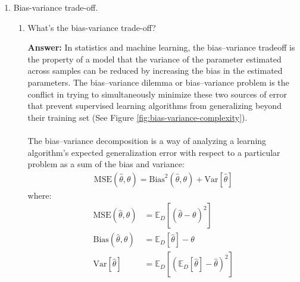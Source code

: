 \documentclass{article}
\newenvironment{QandA}{\begin{enumerate}[label=\arabic*.]}{\end{enumerate}}
\newenvironment{InnerQandA}{\begin{enumerate}[label=\roman*.]}{\end{enumerate}}
\newenvironment{answer}{\par\normalfont \textbf{Answer:}}{}
\begin{document}
\begin{QandA}
    \item Bias-variance trade-off.
    \begin{InnerQandA}
        \item What’s the bias-variance trade-off?
        \begin{answer}
            In statistics and machine learning, the bias–variance tradeoff is the property of a model that the variance of the parameter estimated across samples can be reduced by increasing the bias in the estimated parameters. The bias–variance dilemma or bias–variance problem is the conflict in trying to simultaneously minimize these two sources of error that prevent supervised learning algorithms from generalizing beyond their training set (See Figure \ref{fig:bias-variance-complexity}).\\\\
            The bias–variance decomposition is a way of analyzing a learning algorithm's expected generalization error with respect to a particular problem as a sum of the bias and variance:
            \begin{align*}
                \text{MSE}\left(\hat{\theta}, \theta\right) = \text{Bias}^2\left(\hat{\theta}, \theta\right) + \text{Var}\left[ \hat{\theta} \right]
            \end{align*}
            where:
            \begin{align*}
                \text{MSE}\left(\hat{\theta}, \theta\right) &= \mathbb{E}_{D} \left[(\hat{\theta} - \theta)^2\right] \\
                \text{Bias}\left(\hat{\theta}, \theta \right) &= \mathbb{E}_{D}\left[\hat{\theta}\right] - \theta \\
                \text{Var}\left[\hat{\theta}\right] &= \mathbb{E}_{D} \left[ \left( \mathbb{E}_{D}\left[ \hat{\theta} \right] - \hat{\theta} \right)^2 \right]
            \end{align*}


\end{answer}
\end{InnerQandA}
\end{QandA}
\end{document}
